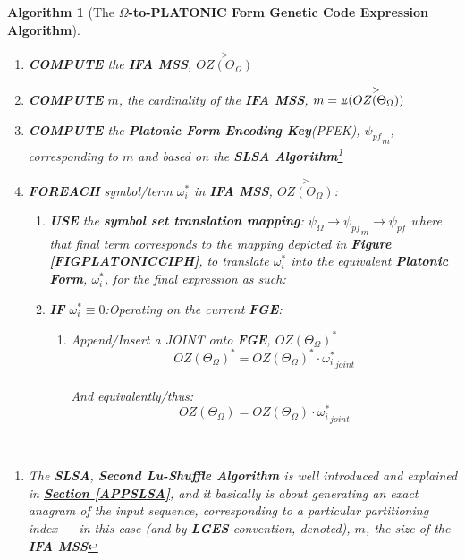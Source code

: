 \documentclass[a4paper, 18pt]{book} %
\newtheorem{alg}{Algorithm}
\newcommand{\invpi}{\rotatebox[origin=c]{180}{$\pi$}}
\begin{document}
\begin{alg}[The \textbf{$\Omega$-to-PLATONIC Form Genetic Code Expression Algorithm}]
\begin{enumerate}
{\begin{enumerate}
{}
\item {
	\textbf{COMPUTE} the \textbf{IFA MSS}, $\overset{>}{OZ(\Theta_\Omega)}$
}
\item {
	\textbf{COMPUTE} $m$, the cardinality of the \textbf{IFA MSS}, $m = \invpi(\overset{>}{OZ(\Theta_\Omega)})$
}
\item {
	\textbf{COMPUTE} the \textbf{Platonic Form Encoding Key}(PFEK), $\boxed{\psi_{pf}}_m$, corresponding to $m$ and based on the \textbf{SLSA Algorithm}\footnote{The \textbf{SLSA}, \textbf{Second Lu-Shuffle Algorithm} is well introduced and explained in \textbf{\hyperref[APPSLSA]{Section \ref{APPSLSA}}}, and it basically is about generating an exact anagram of the input sequence, corresponding to a particular partitioning index --- in this case (and by \textbf{LGES} convention, denoted), $m$, the size of the \textbf{IFA MSS}}
}
\item{\textbf{FOREACH} symbol/term $\omega_i^*$ in \textbf{IFA MSS}, $\overset{>}{OZ(\Theta_\Omega)}$: 
\begin{enumerate}
\item{\textbf{USE} the \textbf{symbol set translation mapping}: $\psi_\Omega \rightarrow \boxed{\psi_{pf}}_m \rightarrow \psi_{pf}$ where that final term corresponds to the mapping depicted in \textbf{Figure \ref{FIGPLATONICCIPH}}, to translate $\omega_i^*$ into the equivalent \textbf{Platonic Form}, $\boxed{\omega_i^*}$, for the final expression as such:}
\item { \textbf{IF} $\omega_i^* \equiv 0$:Operating on the current \textbf{FGE}: 
		\begin{enumerate}
		\item { Append/Insert a JOINT onto \textbf{FGE},  $\boxed{OZ(\Theta_\Omega)}^*$\\

		\begin{equation}
		\label{EQEXTFGEJOINT}
		\boxed{OZ(\Theta_\Omega)}^* = \boxed{OZ(\Theta_\Omega)}^* \cdot \boxed{\omega_i^*}_{joint}
		\end{equation}\\		
		
		And equivalently/thus:\\
		
		\begin{equation}
		\label{EQEXTFGEJOINTSUF}
		\boxed{OZ(\Theta_\Omega)} = \boxed{OZ(\Theta_\Omega)} \cdot \boxed{\omega_i^*}_{joint}
		\end{equation}\\				
		
}
\end{enumerate}}
\end{enumerate}}
\end{enumerate}}
\end{enumerate}
\end{alg}
\end{document}
